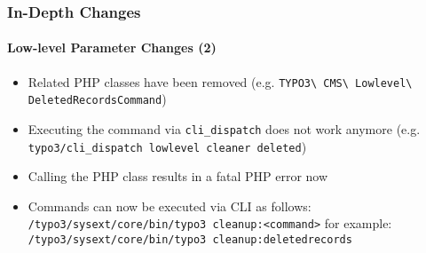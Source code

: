 \begin{frame}[fragile]
	\frametitle{In-Depth Changes}
	\framesubtitle{Low-level Parameter Changes (2)}


	\begin{itemize}
		\item Related PHP classes have been removed\newline
			\smaller(e.g. \texttt{TYPO3\textbackslash
				CMS\textbackslash
				Lowlevel\textbackslash
				DeletedRecordsCommand})
			\normalsize

		\item Executing the command via \texttt{cli\_dispatch} does not work anymore\newline
			\smaller(e.g. \texttt{typo3/cli\_dispatch lowlevel cleaner deleted})\normalsize
		\item Calling the PHP class results in a fatal PHP error now

		\item Commands can now be executed via CLI as follows:\newline
			\smaller\texttt{/typo3/sysext/core/bin/typo3 cleanup:<command>}\normalsize\newline
			for example:\newline
			\smaller\texttt{/typo3/sysext/core/bin/typo3 cleanup:deletedrecords}\normalsize

	\end{itemize}

\end{frame}




